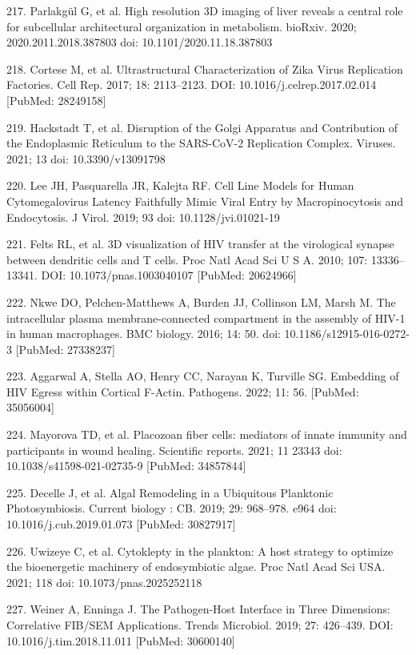 \documentclass{article}
\begin{document}
\begin{hangpars}
217. Parlakgül G, et al. High resolution 3D imaging of liver reveals a central role for subcellular architectural organization in metabolism. bioRxiv. 2020; 2020.2011.2018.387803 doi: 10.1101/2020.11.18.387803

218. Cortese M, et al. Ultrastructural Characterization of Zika Virus Replication Factories. Cell Rep. 2017; 18: 2113–2123. DOI: 10.1016/j.celrep.2017.02.014 [PubMed: 28249158]

219. Hackstadt T, et al. Disruption of the Golgi Apparatus and Contribution of the Endoplasmic Reticulum to the SARS-CoV-2 Replication Complex. Viruses. 2021; 13 doi: 10.3390/v13091798

220. Lee JH, Pasquarella JR, Kalejta RF. Cell Line Models for Human Cytomegalovirus Latency Faithfully Mimic Viral Entry by Macropinocytosis and Endocytosis. J Virol. 2019; 93 doi: 10.1128/jvi.01021-19

221. Felts RL, et al. 3D visualization of HIV transfer at the virological synapse between dendritic cells and T cells. Proc Natl Acad Sci U S A. 2010; 107: 13336–13341. DOI: 10.1073/pnas.1003040107 [PubMed: 20624966]

222. Nkwe DO, Pelchen-Matthews A, Burden JJ, Collinson LM, Marsh M. The intracellular plasma membrane-connected compartment in the assembly of HIV-1 in human macrophages. BMC biology. 2016; 14: 50. doi: 10.1186/s12915-016-0272-3 [PubMed: 27338237]

223. Aggarwal A, Stella AO, Henry CC, Narayan K, Turville SG. Embedding of HIV Egress within Cortical F-Actin. Pathogens. 2022; 11: 56. [PubMed: 35056004]

224. Mayorova TD, et al. Placozoan fiber cells: mediators of innate immunity and participants in wound healing. Scientific reports. 2021; 11 23343 doi: 10.1038/s41598-021-02735-9 [PubMed: 34857844]

225. Decelle J, et al. Algal Remodeling in a Ubiquitous Planktonic Photosymbiosis. Current biology : CB. 2019; 29: 968–978. e964 doi: 10.1016/j.cub.2019.01.073 [PubMed: 30827917]

226. Uwizeye C, et al. Cytoklepty in the plankton: A host strategy to optimize the bioenergetic machinery of endosymbiotic algae. Proc Natl Acad Sci USA. 2021; 118 doi: 10.1073/pnas.2025252118

227. Weiner A, Enninga J. The Pathogen-Host Interface in Three Dimensions: Correlative FIB/SEM Applications. Trends Microbiol. 2019; 27: 426–439. DOI: 10.1016/j.tim.2018.11.011 [PubMed: 30600140]


\end{hangpars}
\end{document}
